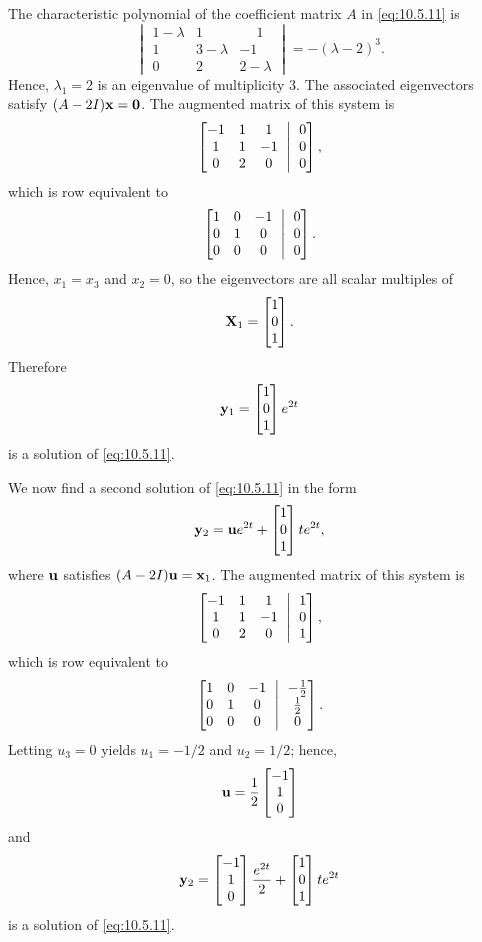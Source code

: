 \begin{solution}
The characteristic polynomial of
the coefficient matrix $A$ in  \eqref{eq:10.5.11} is
\[
\begin{vmatrix}
1-\lambda & 1 & \phantom{-}1\\ 1 & 3-\lambda&-1\\ 0 & 2 & 2-\lambda
\end{vmatrix}
=-(\lambda-2)^3.
\]
Hence, $\lambda_1=2$ is an eigenvalue of multiplicity $3$. The
associated eigenvectors satisfy $(A-2I)\mathbf{x}=\mathbf{0}$. The augmented
matrix of this system is
\[
\amatrix{-1&1&1\\1&1&-1\\0&2&0}{0\\0\\0},
\]
which is row equivalent to
\[
\amatrix{1&0&-1\\0&1&0\\0&0&0}{0\\0\\0}.
\]
Hence, $x_1 =x_3$ and  $x_2 = 0$, so the eigenvectors are all scalar
multiples of
\[
\mathbf{X}_1=\begin{bmatrix}1\\0\\1\end{bmatrix}.
\]
Therefore
\[
\mathbf{y}_1=\begin{bmatrix}1\\0\\1\end{bmatrix}e^{2t}
\]
is a solution of  \eqref{eq:10.5.11}.

We  now find a second solution of  \eqref{eq:10.5.11}  in the form
\[
\mathbf{y}_2=\mathbf{u}e^{2t}+\begin{bmatrix}1\\0\\1\end{bmatrix}te^{2t},
\]
where $\mathbf{u}$ satisfies $(A-2I)\mathbf{u}=\mathbf{x}_1$.
The  augmented matrix  of this system is
\[
\amatrix{-1&1&1\\1&1&-1\\0&2&0}{1\\0\\1},
\]
which is row equivalent to
\[
\amatrix{1&0&-1\\0&1&0\\0&0&0}{-\frac12\\\frac12\\0}.
\]
Letting $u_3=0$ yields $u_1=-1/2$ and $u_2=1/2$; hence,
\[
\mathbf{u}=\frac{1}{2}\begin{bmatrix}-1\\1\\0\end{bmatrix}
\]
and
\[
\mathbf{y}_2=\begin{bmatrix}-1\\1\\0\end{bmatrix}\frac{e^{2t}}{2}+\begin{bmatrix}1\\0\\1\end{bmatrix}te^{2t}
\]
is a solution of  \eqref{eq:10.5.11}.


\end{solution}
